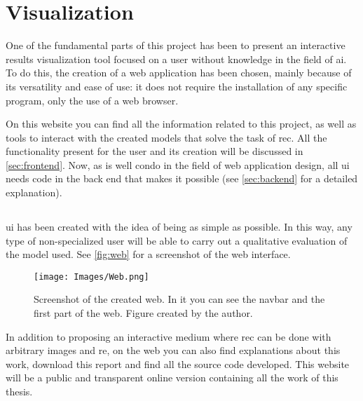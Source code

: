 

\chapter{Visualization}\label{cha:web}



\drop One of the fundamental parts of this project has been to present an
interactive results visualization tool focused on a user without knowledge in
the field of \gls{ai}. To do this, the creation of a web application has been
chosen, mainly because of its versatility and ease of use: it does not require
the installation of any specific program, only the use of a web browser.

On this website you can find all the information related to this project, as
well as tools to interact with the created models that solve the task of
\gls{rec}. All the functionality present for the user and its creation will be
discussed in \vref{sec:frontend}. Now, as is well condo in the field of web
application design, all \gls{ui} needs code in the back end that makes it
possible (see \vref{sec:backend} for a detailed explanation).



\section{}%
\label{sec:frontend}

\gls{ui} has been created with the idea of being as simple as possible. In this
way, any type of non-specialized user will be able to carry out a qualitative
evaluation of the model used. See \vref{fig:web} for a screenshot of the web
interface.

\begin{figure}[ht]
  \centering
  \texttt{[image: Images/Web.png]}
  \caption[Screenshot of the created web]{Screenshot of the created web. In it
    you can see the navbar and the first part of the web. Figure created by the
    author.}\label{fig:web}
\end{figure}

In addition to proposing an interactive medium where \gls{rec} can be done with
arbitrary images and \gls{re}, on the web you can also find explanations about
this work, download this report and find all the source code developed. This
website will be a public and transparent online version containing all the work
of this thesis.

